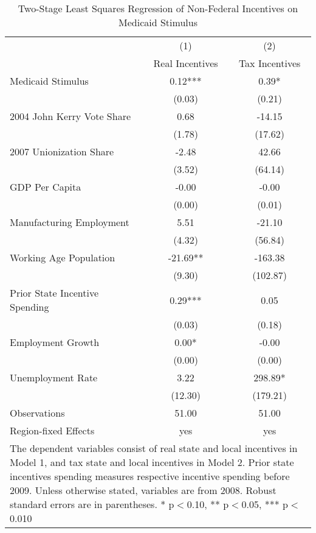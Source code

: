 \begin{table}[!htbp]\centering
\def\sym#1{\ifmmode^{#1}\else\(^{#1}\)\fi}
\caption{Two-Stage Least Squares Regression of Non-Federal Incentives on Medicaid Stimulus}
\begin{tabular}{l*{2}{c}}
\hline\hline
                    &\multicolumn{1}{c}{(1)}   &\multicolumn{1}{c}{(2)}   \\
                    &Real Incentives   &Tax Incentives   \\
\hline
Medicaid Stimulus   &        0.12***&        0.39*  \\
                    &      (0.03)   &      (0.21)   \\
2004 John Kerry Vote Share&        0.68   &      -14.15   \\
                    &      (1.78)   &     (17.62)   \\
2007 Unionization Share&       -2.48   &       42.66   \\
                    &      (3.52)   &     (64.14)   \\
GDP Per Capita      &       -0.00   &       -0.00   \\
                    &      (0.00)   &      (0.01)   \\
Manufacturing Employment&        5.51   &      -21.10   \\
                    &      (4.32)   &     (56.84)   \\
Working Age Population&      -21.69** &     -163.38   \\
                    &      (9.30)   &    (102.87)   \\
Prior State Incentive Spending&        0.29***&        0.05   \\
                    &      (0.03)   &      (0.18)   \\
Employment Growth   &        0.00*  &       -0.00   \\
                    &      (0.00)   &      (0.00)   \\
Unemployment Rate   &        3.22   &      298.89*  \\
                    &     (12.30)   &    (179.21)   \\
\hline
Observations        &       51.00   &       51.00   \\
Region-fixed Effects&         yes   &         yes   \\
\hline\hline
\multicolumn{3}{p{0.75\linewidth}}{\footnotesize The dependent variables consist of real state and local incentives in Model 1, and tax state and local incentives in Model 2. Prior state incentives spending measures respective incentive spending before 2009. Unless otherwise stated, variables are from 2008. Robust standard errors are in parentheses. * p$<$0.10, ** p$<$0.05, *** p$<$0.010}\\
\end{tabular}
\end{table}

